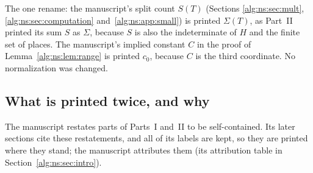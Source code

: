 \documentclass[11pt]{article}
\numberwithin{equation}{section}
\theoremstyle{plain}
\theoremstyle{plain}
\theoremstyle{plain}
\theoremstyle{definition}
\theoremstyle{definition}
\theoremstyle{definition}
\theoremstyle{remark}
\begin{document}
The one rename: the manuscript's split count $S(T)$ (Sections
\ref{alg:ns:sec:mult}, \ref{alg:ns:sec:computation}
and~\ref{alg:ns:app:small}) is printed $\Sigma(T)$, as Part~II printed its
sum $S$ as $\Sigma$, because $S$ is also the indeterminate of $H$ and the
finite set of places. The manuscript's implied constant $C$ in the proof
of Lemma~\ref{alg:ns:lem:range} is printed $c_0$, because $C$ is the third
coordinate. No normalization was changed.

\subsection{What is printed twice, and why}\label{alg:ns:sec:duplicates}
The manuscript restates parts of Parts~I and~II to be self-contained.
Its later sections cite these restatements, and all of its labels are
kept, so they are printed where they stand; the manuscript attributes
them (its attribution table in Section~\ref{alg:ns:sec:intro}).
\end{document}
